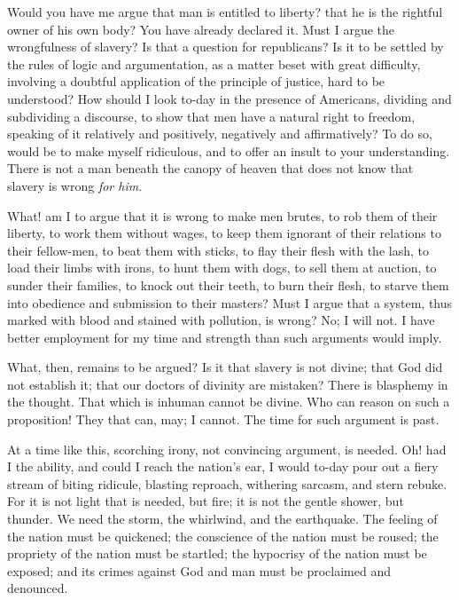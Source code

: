 Would you have me argue that man is entitled to liberty? that he is the
rightful owner of his own body? You have already declared it. Must I
argue the wrongfulness of slavery? Is that a question for republicans?
Is it to be settled by the rules of logic and argumentation, as a matter
beset with great difficulty, involving a doubtful application of the
principle of justice, hard to be understood? How should I look to-day in
the presence of Americans, dividing and subdividing a discourse, to show
that men have a natural right to freedom, speaking of it relatively and
positively, negatively and affirmatively? To do so, would be to make
myself ridiculous, and to offer an insult to your understanding. There
is not a man beneath the canopy of heaven that does not know that
slavery is wrong \emph{for him}.

What! am I to argue that it is wrong to make men brutes, to rob them of
their liberty, to work them without wages, to keep them ignorant of
their relations to their fellow-men, to beat them with sticks, to flay
their flesh with the lash, to load their limbs with irons, to hunt them
with dogs, to sell them at auction, to sunder their families, to knock
out their teeth, to burn their flesh, to starve them into obedience and
submission to their masters? Must I argue that a system, thus marked
with blood and stained with pollution, is wrong? No; I will not. I have
better employment for my time and strength than such arguments would
imply.

What, then, remains to be argued? Is it that slavery is not divine; that
God did not establish it; that our doctors of divinity are mistaken?
There is blasphemy in the thought. That which is inhuman cannot be
divine. Who can reason on such a proposition! They that can, may; I
cannot. The time for such argument is past.

At a time like this, scorching irony, not convincing argument, is
needed. Oh! had I the ability, and could I reach the nation's ear, I
would to-day pour out a fiery stream of biting ridicule, blasting
reproach, withering sarcasm, and stern rebuke. For it is not light that
is needed, but fire; it is not the gentle shower, but thunder. We need
the storm, the whirlwind, and the earthquake.
{\protect\hypertarget{445}{}{}}The feeling of the nation must be
quickened; the conscience of the nation must be roused; the propriety of
the nation must be startled; the hypocrisy of the nation must be
exposed; and its crimes against God and man must be proclaimed and
denounced.

